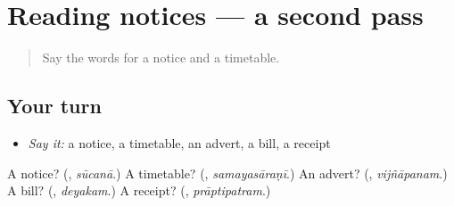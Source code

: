\section[(dialogue)]{Reading notices — a second pass}

\label{lesson:SA-R140-second-pass-reading-notices}



\begin{quote}
Say the words for a notice and a timetable.
\end{quote}

\subsection*{Your turn}
\begin{itemize}
\raggedright
  \item \emph{Say it:} a notice, a timetable, an advert, a bill, a receipt
\end{itemize}

\begin{tcolorbox}[breakable,colback=teal!4,colframe=teal!35!black,title={Before you move on}]
A notice? (\textbf{}, \emph{sūcanā}.) A timetable? (\textbf{}, \emph{samayasāraṇī}.) An advert? (\textbf{}, \emph{vijñāpanam}.) A bill? (\textbf{}, \emph{deyakam}.) A receipt? (\textbf{}, \emph{prāptipatram}.)
\end{tcolorbox}
